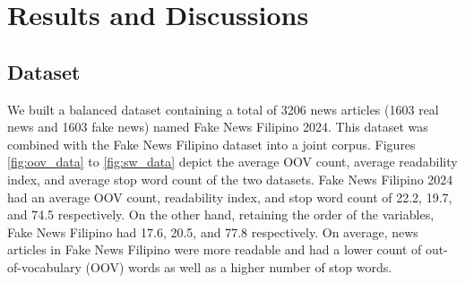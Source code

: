 \chapter{Results and Discussions}

\section{Dataset}
We built a balanced dataset containing a total of 3206 news articles (1603 real news and 1603 fake news) named Fake News Filipino 2024. This dataset was combined with the Fake News Filipino \cite{fake-news-filipino} dataset into a joint corpus. Figures \ref{fig:oov_data} to \ref{fig:sw_data} depict the average OOV count, average readability index, and average stop word count of the two datasets. Fake News Filipino 2024 had an average OOV count, readability index, and stop word count of 22.2, 19.7, and 74.5 respectively. On the other hand, retaining the order of the variables, Fake News Filipino had 17.6, 20.5, and 77.8 respectively. On average, news articles in Fake News Filipino were more readable and had a lower count of out-of-vocabulary (OOV) words as well as a higher number of stop words.

